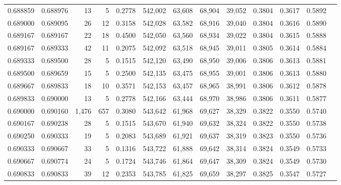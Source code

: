 \begin{tabular}{rrrrrrrrrrrrr}
0.688859 & 0.688976 &    13 &   5 &                                     0.2778 & 542,002 &  63,608 &  68,904 &  39,052 & 0.3804 & 0.3617 & 0.5892 \\
0.689000 & 0.689095 &    26 &  12 &                                     0.3158 & 542,028 &  63,582 &  68,916 &  39,040 & 0.3804 & 0.3616 & 0.5890 \\
0.689167 & 0.689167 &    22 &  18 &                                     0.4500 & 542,050 &  63,560 &  68,934 &  39,022 & 0.3804 & 0.3615 & 0.5888 \\
0.689167 & 0.689333 &    42 &  11 &                                     0.2075 & 542,092 &  63,518 &  68,945 &  39,011 & 0.3805 & 0.3614 & 0.5884 \\
0.689333 & 0.689500 &    28 &   5 &                                     0.1515 & 542,120 &  63,490 &  68,950 &  39,006 & 0.3806 & 0.3613 & 0.5881 \\
0.689500 & 0.689659 &    15 &   5 &                                     0.2500 & 542,135 &  63,475 &  68,955 &  39,001 & 0.3806 & 0.3613 & 0.5880 \\
0.689667 & 0.689833 &    18 &  10 &                                     0.3571 & 542,153 &  63,457 &  68,965 &  38,991 & 0.3806 & 0.3612 & 0.5878 \\
0.689833 & 0.690000 &    13 &   5 &                                     0.2778 & 542,166 &  63,444 &  68,970 &  38,986 & 0.3806 & 0.3611 & 0.5877 \\
0.690000 & 0.690160 & 1,476 & 657 &                                     0.3080 & 543,642 &  61,968 &  69,627 &  38,329 & 0.3822 & 0.3550 & 0.5740 \\
0.690167 & 0.690238 &    28 &   5 &                                     0.1515 & 543,670 &  61,940 &  69,632 &  38,324 & 0.3822 & 0.3550 & 0.5738 \\
0.690250 & 0.690333 &    19 &   5 &                                     0.2083 & 543,689 &  61,921 &  69,637 &  38,319 & 0.3823 & 0.3550 & 0.5736 \\
0.690333 & 0.690667 &    33 &   5 &                                     0.1316 & 543,722 &  61,888 &  69,642 &  38,314 & 0.3824 & 0.3549 & 0.5733 \\
0.690667 & 0.690774 &    24 &   5 &                                     0.1724 & 543,746 &  61,864 &  69,647 &  38,309 & 0.3824 & 0.3549 & 0.5730 \\
0.690833 & 0.690833 &    39 &  12 &                                     0.2353 & 543,785 &  61,825 &  69,659 &  38,297 & 0.3825 & 0.3547 & 0.5727 \\

\end{tabular}
